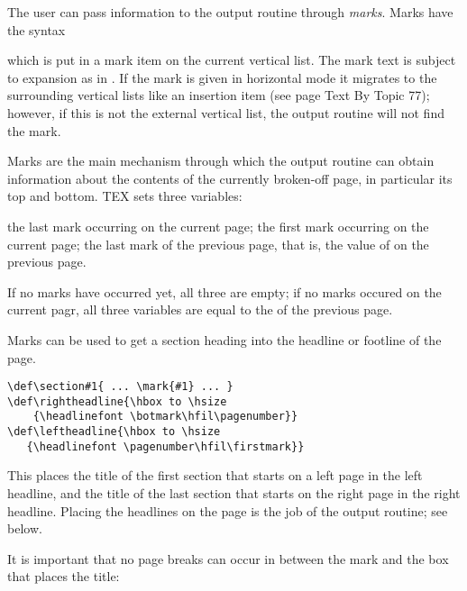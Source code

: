 \begin{multicols}{2}
The user can pass information to the output routine through \textit{marks}. Marks have the syntax

\begin{teX}
\end{teX}

which is put in a mark item on the current vertical list. The mark text is subject to expansion
as in .
If the mark is given in horizontal mode it migrates to the surrounding vertical lists like an
insertion item (see page Text By Topic 77); however, if this is not the external vertical list, the output routine
will not find the mark.

Marks are the main mechanism through which the output routine can obtain information
about the contents of the currently broken-off page, in particular its top and bottom. TEX sets
three variables:

{\obeylines
{} the last mark occurring on the current page;
 the first mark occurring on the current page;
 the last mark of the previous page, that is, the value of  on the previous
page.
}



If no marks have occurred yet, all three are empty; if no marks occured on the current pagr, all three variables are equal to the  of the previous page. 

Marks can be used to get a section heading into the headline or footline of the page.

\begin{verbatim}
\def\section#1{ ... \mark{#1} ... }
\def\rightheadline{\hbox to \hsize
    {\headlinefont \botmark\hfil\pagenumber}}
\def\leftheadline{\hbox to \hsize
   {\headlinefont \pagenumber\hfil\firstmark}}
\end{verbatim}

This places the title of the first section that starts on a left page in the left
headline, and the title of the last section that starts on the right page in
the right headline. Placing the headlines on the page is the job of the output
routine; see below.

It is important that no page breaks can occur in between the mark and the
box that places the title:

\begin{teXXX}
\def\section#1{ ...
   \penalty\beforesectionpenalty
   \mark{#1}
   \hbox{ ... #1 ...}
   \nobreak
   \vskip\aftersectionskip
   \noindent}
\end{teXXX}
\end{multicols}

